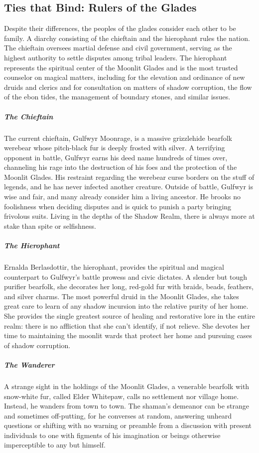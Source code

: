 \documentclass[10pt,a4paper,twoside,bg=print,twocolumn,openany,nodeprecatedcode]{dndbook}
\begin{document}
\subsection{Ties that Bind: Rulers of the Glades}
Despite their differences, the peoples of the glades consider each other to be family. A diarchy consisting of the chieftain and the hierophant rules the nation. The chieftain oversees martial defense and civil government, serving as the highest authority to settle disputes among tribal leaders. The hierophant represents the spiritual center of the Moonlit Glades and is the most trusted counselor on magical matters, including for the elevation and ordinance of new druids and clerics and for consultation on matters of shadow corruption, the flow of the ebon tides, the management of boundary stones, and similar issues.

\subparagraph{The Chieftain}
The current chieftain, Gulfwyr Moonrage, is a massive grizzlehide bearfolk werebear whose pitch-black fur is deeply frosted with silver. A terrifying opponent in battle, Gulfwyr earns his deed name hundreds of times over, channeling his rage into the destruction of his foes and the protection of the Moonlit Glades. His restraint regarding the werebear curse borders on the stuff of legends, and he has never infected another creature. Outside of battle, Gulfwyr is wise and fair, and many already consider him a living ancestor. He brooks no foolishness when deciding disputes and is quick to punish a party bringing frivolous suits. Living in the depths of the Shadow Realm, there is always more at stake than spite or selfishness.

\subparagraph{The Hierophant}
Ernalda Berlasdottir, the hierophant, provides the spiritual and magical counterpart to Gulfwyr's battle prowess and civic dictates. A slender but tough purifier bearfolk, she decorates her long, red-gold fur with braids, beads, feathers, and silver charms. The most powerful druid in the Moonlit Glades, she takes great care to learn of any shadow incursion into the relative purity of her home. She provides the single greatest source of healing and restorative lore in the entire realm: there is no affliction that she can't identify, if not relieve. She devotes her time to maintaining the moonlit wards that protect her home and pursuing cases of shadow corruption.

\subparagraph{The Wanderer}
A strange sight in the holdings of the Moonlit Glades, a venerable bearfolk with snow-white fur, called Elder Whitepaw, calls no settlement nor village home. Instead, he wanders from town to town. The shaman's demeanor can be strange and sometimes off-putting, for he converses at random, answering unheard questions or shifting with no warning or preamble from a discussion with present individuals to one with figments of his imagination or beings otherwise imperceptible to any but himself.
\end{document}
